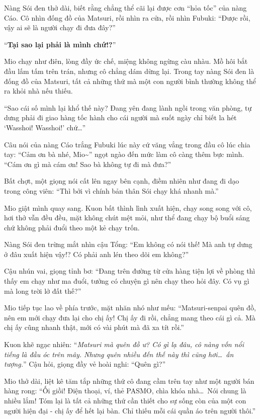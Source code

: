 \documentclass[../main.tex]{subfiles}
\begin{document}
Nàng Sói đen thở dài, biết rằng chẳng thể cãi lại được cơn ``hỏa tốc'' của nàng Cáo. Cô nhìn đống đồ của Matsuri, rồi nhìn ra cửa, rồi nhìn Fubuki: ``Được rồi, vậy ai sẽ là người chạy đi đưa đây?''

\ct

``\textbf{Tại sao lại phải là mình chứ!?}''


Mio chạy như điên, lòng đầy ức chế, miệng không ngừng càu nhàu. Mồ hôi bắt đầu lấm tấm trên trán, nhưng cô chẳng dám dừng lại. Trong tay nàng Sói đen là đống đồ của Matsuri, tất cả những thứ mà một con người bình thường không thể ra khỏi nhà nếu thiếu.

``Sao cái số mình lại khổ thế này? Đang yên đang lành ngồi trong văn phòng, tự dưng phải đi giao hàng tốc hành cho cái người mà suốt ngày chỉ biết la hét `Wasshoi! Wasshoi!' chứ\dots''

Câu nói của nàng Cáo trắng Fubuki lúc này cứ văng vẳng trong đầu cô lúc chia tay: ``Cảm ơn bà nhé, Mio\~{}'' ngọt ngào đến mức làm cô càng thêm bực mình. ``Cám ơn gì mà cám ơn! Sao bà không tự đi mà đưa?''

Bất chợt, một giọng nói cất lên ngay bên cạnh, điềm nhiên như đang đi dạo trong công viên: ``Thì bởi vì chính bản thân Sói chạy khá nhanh mà.''

Mio giật mình quay sang. Kuon bất thình lình xuất hiện, chạy song song với cô, hơi thở vẫn đều đều, mặt không chút mệt mỏi, như thể đang chạy bộ buổi sáng chứ không phải đuổi theo một kẻ chạy trốn.

Nàng Sói đen trừng mắt nhìn cậu Tổng: ``Em không có nói thế! Mà anh tự dưng ở đâu xuất hiện vậy!? Có phải anh lén theo dõi em không?''

Cậu nhún vai, giọng tỉnh bơ: ``Đang trên đường từ cửa hàng tiện lợi về phòng thì thấy em chạy như ma đuổi, tưởng có chuyện gì nên chạy theo hỏi đây. Có vụ gì mà long trời lở đất thế?''

Mio tiếp tục lao về phía trước, mặt nhăn nhó như mếu: ``Matsuri-senpai quên đồ, nên em mới chạy đưa lại cho chị ấy! Chị ấy đi rồi, chẳng mang theo cái gì cả. Mà chị ấy cũng nhanh thật, mới có vài phút mà đã xa tít rồi.''

Kuon khẽ ngạc nhiên: ``\textit{Matsuri mà quên đồ ư? Có gì lạ đâu, cô nàng vốn nổi tiếng là đầu óc trên mây. Nhưng quên nhiều đến thế này thì cũng hơi\dots\ ấn tượng.}'' Cậu hỏi, giọng đầy vẻ hoài nghi: ``Quên gì?''

Mio thở dài, liệt kê tăm tắp những thứ cô đang cầm trên tay như một người bán hàng rong: ``Ối giồi! Điện thoại, ví, thẻ PASMO, chìa khóa nhà\dots\ Nói chung là nhiều lắm! Tóm lại là tất cả những thứ cần thiết cho sự sống còn của một con người hiện đại - chị ấy để hết lại bàn. Chỉ thiếu mỗi cái quần áo trên người thôi.''
\end{document}
